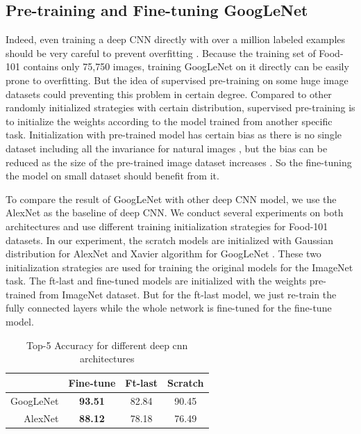 \subsection{Pre-training and Fine-tuning GoogLeNet}
Indeed, even training a deep CNN directly with over a million labeled examples should be very careful to prevent overfitting \cite{krizhevsky2012imagenet}.
Because the training set of Food-101 contains only 75,750 images, training GoogLeNet on it directly can be easily prone to overfitting. But the idea of supervised pre-training on some huge image datasets could preventing this problem in certain degree. Compared to other randomly initialized strategies with certain distribution, supervised pre-training is to initialize the weights according to the model trained from another specific task. Initialization with pre-trained model has certain bias as there is no single dataset including all the invariance for natural images , but the bias can be reduced as the size of the pre-trained image dataset increases \cite{agrawal2014analyzing}. So the fine-tuning the model on small dataset should benefit from it.

To compare the result of GoogLeNet with other deep CNN model, we use the AlexNet as the baseline of deep CNN.
We conduct several experiments on both architectures and use different training initialization strategies for Food-101 datasets. In our experiment, the scratch models are initialized with Gaussian distribution for AlexNet and Xavier algorithm for GoogLeNet \cite{glorot2010understanding}. These two initialization strategies are used for training the original models for the ImageNet task. The ft-last and fine-tuned models are initialized with the weights pre-trained from ImageNet dataset. But for the ft-last model, we just re-train the fully connected layers while the whole network is fine-tuned for the fine-tune model.
\begin{table}[htbp]
  \centering
  \caption{Top-5 Accuracy for different deep cnn architectures}
    \begin{tabular}{r|ccc}
    \toprule
          & Fine-tune & Ft-last & Scratch \\
    \midrule
    GoogLeNet & \textbf{93.51} & 82.84 & 90.45 \\
    AlexNet & \textbf{88.12} & 78.18 & 76.49 \\
    \bottomrule
    \end{tabular}%
  \label{tab:ft}%
\end{table}%



